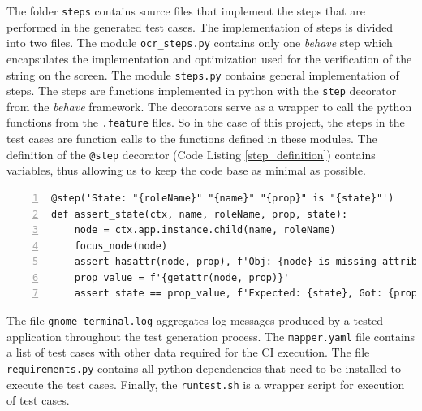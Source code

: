 The folder \texttt{steps} contains source files that implement the steps that are performed in the generated test cases. The implementation of steps is divided into two files. The module \texttt{ocr\_steps.py} contains only one \textit{behave} step which encapsulates the implementation and optimization used for the verification of the string on the screen. The module \texttt{steps.py} contains general implementation of steps. The steps are functions implemented in python with the \texttt{step} decorator from the \textit{behave} framework. The decorators serve as a wrapper to call the python functions from the \texttt{.feature} files. So in the case of this project, the steps in the test cases are function calls to the functions defined in these modules. The definition of the \texttt{@step} decorator (Code Listing \ref{step_definition}) contains variables, thus allowing us to keep the code base as minimal as possible.


\begin{lstlisting}[style=mypython,caption={Test},label={step_definition},
  frame=tb,
  numbers=left
]
@step('State: "{roleName}" "{name}" "{prop}" is "{state}"')
def assert_state(ctx, name, roleName, prop, state):
    node = ctx.app.instance.child(name, roleName)
    focus_node(node)
    assert hasattr(node, prop), f'Obj: {node} is missing attribute {prop}'
    prop_value = f'{getattr(node, prop)}'
    assert state == prop_value, f'Expected: {state}, Got: {prop_value}'
\end{lstlisting}

The file \texttt{gnome-terminal.log} aggregates log messages produced by a tested application throughout the test generation process. The \texttt{mapper.yaml} file contains a list of test cases with other data required for the CI execution. The file \texttt{requirements.py} contains all python dependencies that need to be installed to execute the test cases. Finally, the \texttt{runtest.sh} is a wrapper script for execution of test cases.

